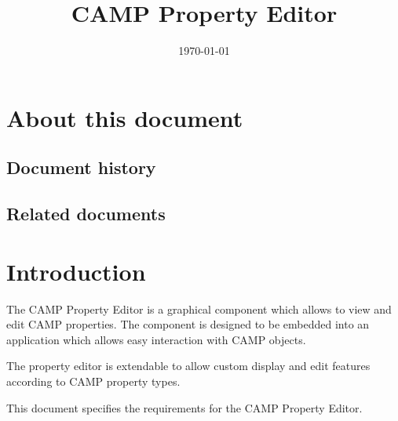 \documentclass[a4paper, twoside]{report}
\title{CAMP Property Editor}
\date{\today}
\begin{document}
\maketitle

\chapter*{About this document}

\section*{Document history}

\begin{historytable}
\end{historytable}

\section*{Related documents}

\begin{documenttable}
\end{documenttable}

\tableofcontents


\chapter{Introduction\label{sec:introduction}}

The CAMP Property Editor is a graphical component which allows to view and edit CAMP properties. The
component is designed to be embedded into an application which allows easy interaction with CAMP
objects.

The property editor is extendable to allow custom display and edit features according to CAMP property
types.

This document specifies the requirements for the CAMP Property Editor.
\end{document}
